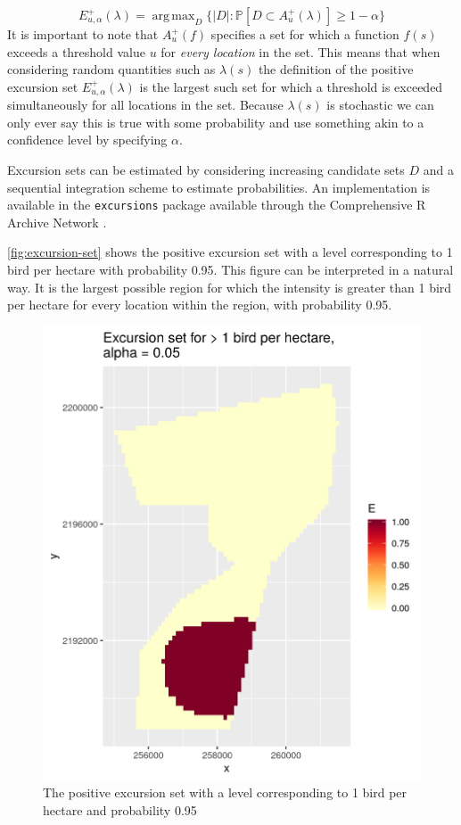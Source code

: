 \documentclass[preprint,12pt]{elsarticle}
\DeclareMathOperator*{\argmax}{arg\,max}  %
\begin{document}
\begin{equation*}
E_{u,\alpha}^{+}(\lambda) = \argmax_{D}\{\lvert D \rvert : \mathbb{P}\left[D \subset A_u^{+}(\lambda)\right] \geq 1 - \alpha \}
\end{equation*}
It is important to note that $A_u^{+}(f)$ specifies a set for which a function $f(s)$ exceeds a threshold value $u$ for \textit{every location} in the set.  This means that when considering random quantities such as $\lambda(s)$ the definition of the positive excursion set $E_{u,\alpha}^{+}(\lambda)$ is the largest such set for which a threshold is exceeded simultaneously for all locations in the set.  Because $\lambda(s)$ is stochastic we can only ever say this is true with some probability and use something akin to a confidence level by specifying $\alpha$.

Excursion sets can be estimated by considering increasing candidate sets $D$ and a sequential integration scheme to estimate probabilities.  An implementation is available in the \texttt{excursions} package \citep{bolin_calculating_2018} available through the Comprehensive R Archive Network \citep{r_2017}.

\autoref{fig:excursion-set} shows the positive excursion set with a level corresponding to 1 bird per hectare with probability 0.95.  This figure can be interpreted in a natural way.  It is the largest possible region for which the intensity is greater than 1 bird per hectare for every location within the region, with probability 0.95.

\begin{figure}
	\includegraphics[scale=0.5]{figures/excursion_set.png}
	\caption{The positive excursion set with a level corresponding to 1 bird per hectare and probability 0.95}
	\label{fig:excursion-set}
\end{figure}
\end{document}
